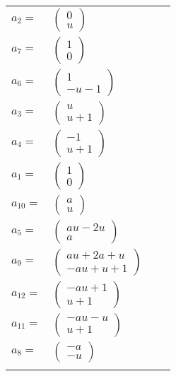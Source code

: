 \documentclass[1p]{elsarticle_modified}
\theoremstyle{definition}
\begin{document}
\begin{tabular}{m{7pt} m{180pt} m{7pt} m{180pt} }
\flushright $a_{2}=$&$\begin{pmatrix}0\\u\end{pmatrix}$ \\
\flushright $a_{7}=$&$\begin{pmatrix}1\\0\end{pmatrix}$ \\
\flushright $a_{6}=$&$\begin{pmatrix}1\\- u-1\end{pmatrix}$ \\
\flushright $a_{3}=$&$\begin{pmatrix}u\\u+1\end{pmatrix}$ \\
\flushright $a_{4}=$&$\begin{pmatrix}-1\\u+1\end{pmatrix}$ \\
\flushright $a_{1}=$&$\begin{pmatrix}1\\0\end{pmatrix}$ \\
\flushright $a_{10}=$&$\begin{pmatrix}a\\u\end{pmatrix}$ \\
\flushright $a_{5}=$&$\begin{pmatrix}a u-2 u\\a\end{pmatrix}$ \\
\flushright $a_{9}=$&$\begin{pmatrix}a u+2 a+u\\- a u+u+1\end{pmatrix}$ \\
\flushright $a_{12}=$&$\begin{pmatrix}- a u+1\\u+1\end{pmatrix}$ \\
\flushright $a_{11}=$&$\begin{pmatrix}- a u- u\\u+1\end{pmatrix}$ \\
\flushright $a_{8}=$&$\begin{pmatrix}- a\\- u\end{pmatrix}$\\&\end{tabular}
\end{document}
